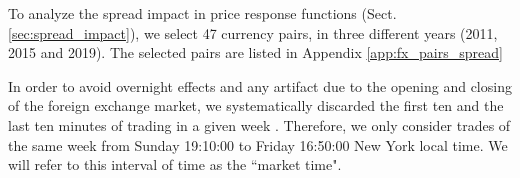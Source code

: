 To analyze the spread impact in price response functions (Sect.
\ref{sec:spread_impact}), we select 47 currency pairs, in three different years
(2011, 2015 and 2019). The selected pairs are listed in Appendix
\ref{app:fx_pairs_spread}

In order to avoid overnight effects and any artifact due to the opening and
closing of the foreign exchange market, we systematically discarded the first
ten and the last ten minutes of trading in a given week
\cite{Bouchaud_2004,large_prices_changes,spread_changes_affect,Wang_2016_cross,my_paper_response_financial}.
Therefore, we only consider trades of the same week from Sunday 19:10:00 to
Friday 16:50:00 New York local time. We will refer to this interval of time as
the ``market time".

